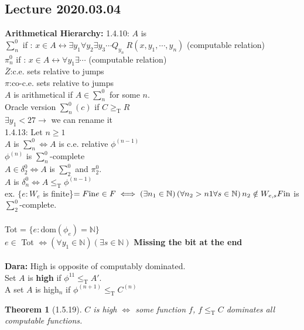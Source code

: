 \documentclass{article}
\let\ddd\cdots
\newcommand{\N}{\mathbb{N}}
\newcommand{\dom}{\mathrm{dom}}
\newcommand{\tr}{\leq_\mathrm{T}}
\newtheorem{theorem}{Theorem}[section]
\theoremstyle{definition}
\theoremstyle{remark}
\theoremstyle{example}
\begin{document}
	\subsection*{Lecture 2020.03.04}
	\textbf{Arithmetical Hierarchy:}
	1.4.10: $A$ is\\
	$\sum_n^0$ if : $x \in A \leftrightarrow \exists y_1 \forall y_2 \exists y_3 \ddd Q_{y_n}\ R(x,y_1,\ddd,y_n)$ (computable relation)\\
	$\pi_n^0$ if : $x \in A \leftrightarrow \forall y_1 \exists\ddd $ (computable relation)\\
	$\bar{Z}$:c.e. sets relative to jumps\\
	$\pi$:co-c.e. sets relative to jumps\\
	$A$ is arithmetical if $A \in \sum_n^0$ for some $n$.\\
	Oracle version $\sum_n^0(c)$ if $C \geq_\mathrm{T}R$\\
	$\exists y_1 < 27 \rightarrow$ we can rename it\\
	1.4.13: Let $n \geq 1$\\
	$A$ is $\sum_n^0 \iff A$ is c.e. relative $\phi^{(n-1)}$\\
	$\phi^{(n)}$ is $\sum_n^0$-complete\\
	$A \in \delta_2^0 \iff A$ is $\sum_2^0$ and $\pi_2^0$.\\
	$A$ is $\delta_n^0 \iff A \tr \phi^{(n-1)}$\\
	ex. $\{e:W_e$ is finite\}$=F\mathrm{in}\\
	e \in F \iff \left(\exists n_1 \in \N\right)\left( \forall n_2 > n1 \forall s \in \N \right)\\
	n_2 \notin W_{e,s}\\
	F\mathrm{in}$ is $\sum_2^0$-complete.\\\\
	Tot = $\{e:\dom(\phi_e)=\N\}$\\
	$e \in$ Tot $\iff (\forall y_1 \in \N)(\exists s \in \N)$
	\textbf{Missing the bit at the end}\\\\	
	\textbf{Dara:} High is opposite of computably dominated.\\
 	Set $A$ is \textbf{high} if $\phi^{11} \tr A'$.\\
 	A set $A$ is high$_n$ if $\phi^{(n+1)} \tr C^{(n)}$\\
 	\begin{theorem}[1.5.19]
 		$C$ is high $\iff$ some function $f$, $f \tr C$ dominates all computable functions.
 	\end{theorem}
\end{document}
